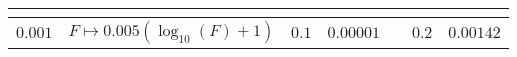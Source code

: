 {\setlength\tabcolsep{3pt}
\begin{tabular}{cccc c cc}
	\toprule

	\multicolumn{1}{c}{\bold{$w_{\text{class}}$}}	&
	\multicolumn{1}{c}{\bold{$w_{\text{org}}$}}	&
	\multicolumn{1}{c}{\bold{$w_{\text{ref}}$}}	&
	\multicolumn{1}{c}{\bold{$w_{\text{comm}}$}}	&
		&
	\multicolumn{1}{c}{\bold{$w_{\text{repulse}}$}}	&
	\multicolumn{1}{c}{\bold{$w_{\text{center}}$}}	\\

	\midrule

	$0.001$	&
	$F \mapsto 0.005 \left(\log_{10}(F) + 1\right)$	&
	$0.1$	&
	$0.00001$	&
		&
	$0.2$	&
	$0.00142$	\\

	\bottomrule
\end{tabular}}
